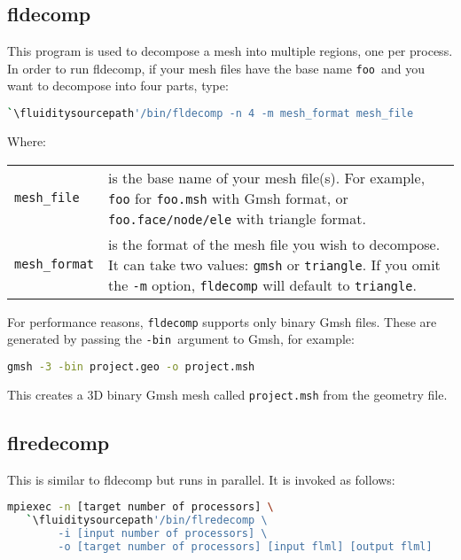 \subsection{fldecomp}
\label{mesh!meshing tools!fldecomp}
This program is used to decompose a mesh into multiple regions, one per
process. In order to run fldecomp, if your mesh files have the base name
\lstinline{foo}\ and you want to decompose into four parts, type:
\begin{lstlisting}[language = Bash]
`\fluiditysourcepath'/bin/fldecomp -n 4 -m mesh_format mesh_file
\end{lstlisting}

Where:
\begin{center}
  \begin{tabular}{lp{}}
    \lstinline+mesh_file+ & is the base name of your mesh file(s). For
    example, \lstinline+foo+ for \lstinline+foo.msh+ with Gmsh format, or
    \lstinline+foo.face/node/ele+ with triangle format.\\
    \lstinline+mesh_format+ & is the format of the mesh file you wish to
    decompose. It can take two values: \lstinline+gmsh+ or
    \lstinline+triangle+. If you omit the \lstinline+-m+ option,
    \lstinline+fldecomp+ will default to \lstinline+triangle+.
  \end{tabular}
\end{center}

For performance reasons, \lstinline[language=Bash]{fldecomp} supports only
binary Gmsh files. These are generated by passing the \lstinline{-bin}\
argument to Gmsh, for example:

\begin{lstlisting}[language=bash]
gmsh -3 -bin project.geo -o project.msh
\end{lstlisting}

This creates a 3D binary Gmsh mesh called \lstinline{project.msh} from the geometry file.



\subsection{flredecomp}
\label{mesh!meshing tools!flredecomp}
This is similar to fldecomp but runs in parallel. It is invoked as follows:
\begin{lstlisting}[language=bash]
mpiexec -n [target number of processors] \
   `\fluiditysourcepath'/bin/flredecomp \
        -i [input number of processors] \
        -o [target number of processors] [input flml] [output flml]
\end{lstlisting}


